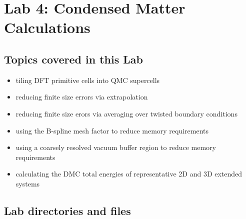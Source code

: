 \chapter{Lab 4: Condensed Matter Calculations} %




\section{Topics covered in this Lab}
\begin{itemize}
  \item{tiling DFT primitive cells into QMC supercells}
  \item{reducing finite size errors via extrapolation}
  \item{reducing finite size erors via averaging over twisted boundary conditions}
  \item{using the B-spline mesh factor to reduce memory requirements}
  \item{using a coarsely resolved vacuum buffer region to reduce memory requirements}
  \item{calculating the DMC total energies of representative 2D and 3D extended systems}
\end{itemize}



\section{Lab directories and files}

